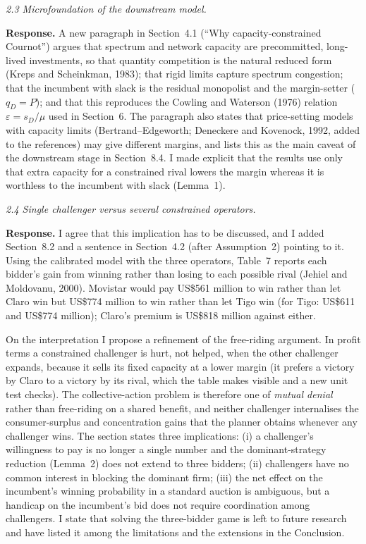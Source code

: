 \documentclass[11pt,a4paper]{article}
\newcommand{\rep}[1]{\par\smallskip\noindent\textbf{Response.} #1\par\bigskip}
\newcommand{\com}[1]{\par\medskip\noindent\textit{#1}\par}
\begin{document}
\com{2.3 Microfoundation of the downstream model.}
\rep{A new paragraph in Section~4.1 (``Why capacity-constrained Cournot'') argues that spectrum and network capacity are precommitted, long-lived investments, so that quantity competition is the natural reduced form (Kreps and Scheinkman, 1983); that rigid limits capture spectrum congestion; that the incumbent with slack is the residual monopolist and the margin-setter ($q_D=P$); and that this reproduces the Cowling and Waterson (1976) relation $\varepsilon=s_D/\mu$ used in Section~6. The paragraph also states that price-setting models with capacity limits (Bertrand--Edgeworth; Deneckere and Kovenock, 1992, added to the references) may give different margins, and lists this as the main caveat of the downstream stage in Section~8.4. I made explicit that the results use only that extra capacity for a constrained rival lowers the margin whereas it is worthless to the incumbent with slack (Lemma~1).}

\com{2.4 Single challenger versus several constrained operators.}
\rep{I agree that this implication has to be discussed, and I added Section~8.2 and a sentence in Section~4.2 (after Assumption~2) pointing to it. Using the calibrated model with the three operators, Table~7 reports each bidder's gain from winning rather than losing to each possible rival (Jehiel and Moldovanu, 2000). Movistar would pay US\$561 million to win rather than let Claro win but US\$774 million to win rather than let Tigo win (for Tigo: US\$611 and US\$774 million); Claro's premium is US\$818 million against either.

On the interpretation I propose a refinement of the free-riding argument. In profit terms a constrained challenger is hurt, not helped, when the other challenger expands, because it sells its fixed capacity at a lower margin (it prefers a victory by Claro to a victory by its rival, which the table makes visible and a new unit test checks). The collective-action problem is therefore one of \emph{mutual denial} rather than free-riding on a shared benefit, and neither challenger internalises the consumer-surplus and concentration gains that the planner obtains whenever any challenger wins. The section states three implications: (i) a challenger's willingness to pay is no longer a single number and the dominant-strategy reduction (Lemma~2) does not extend to three bidders; (ii) challengers have no common interest in blocking the dominant firm; (iii) the net effect on the incumbent's winning probability in a standard auction is ambiguous, but a handicap on the incumbent's bid does not require coordination among challengers. I state that solving the three-bidder game is left to future research and have listed it among the limitations and the extensions in the Conclusion.}
\end{document}
